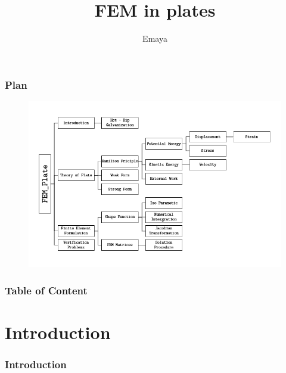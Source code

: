 \documentclass[9pt]{beamer}
\begin{document}
\title[FEM on plates]{FEM in plates}
\author{Emaya}
\institute[ECN]


\begin{frame}
\titlepage
\end{frame}

\begin{frame}
\frametitle{Plan}
\begin{figure}[h!]
  \includegraphics[width=1\linewidth,trim={0 0 0 1cm},clip]{tree.png}
\end{figure}
\end{frame}

\begin{frame}
\frametitle{Table of Content}
\tableofcontents
\end{frame}
\section{Introduction}
\begin{frame}
\frametitle{Introduction}
\end{frame}
\end{document}
